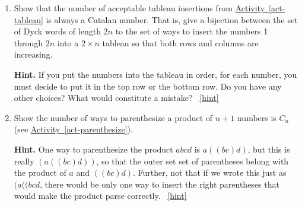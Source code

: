 \documentclass{book}
\begin{document}
\setcounter{project}{179}
\addtocounter{project}{-1}
\begin{activity}[]\label{activity-172}
\leavevmode%
\begin{enumerate}[font=\bfseries,label=(\alph*),ref=\alph*]
\item\label{task-189} \hypertarget{p-1028}{}%
Show that the number of acceptable tableau insertions from \hyperref[act-tableau]{Activity~\ref{act-tableau}} is always a Catalan number.  That is, give a bijection between the set of Dyck words of length \(2n\) to the set of ways to insert the numbers 1 through \(2n\) into a \(2\times n\) tableau so that both rows and columns are increasing.%
\par\smallskip%
\noindent\textbf{Hint.}\hypertarget{hint-118}{}\quad%
\hypertarget{p-1029}{}%
If you put the numbers into the tableau in order, for each number, you must decide to put it in the top row or the bottom row.  Do you have any other choices?  What would constitute a mistake?%
~\hfill{\tiny\hyperlink{a-179.a}{[hint]}\hypertarget{q-179.a}{}}\item\label{task-190} \hypertarget{p-1030}{}%
Show the number of ways to parenthesize a product of \(n+1\) numbers is \(C_n\) (see \hyperref[act-parenthesize]{Activity~\ref{act-parenthesize}}).%
\par\smallskip%
\noindent\textbf{Hint.}\hypertarget{hint-119}{}\quad%
\hypertarget{p-1031}{}%
One way to parenthesize the product \(abcd\) is \(a((bc)d)\), but this is really \((a((bc)d))\), so that the outer set set of parentheses belong with the product of \(a\) and \(((bc)d)\).  Further, not that if we wrote this just as \((a((bcd\), there would be only one way to insert the right parentheses that would make the product parse correctly.%
~\hfill{\tiny\hyperlink{a-179.b}{[hint]}\hypertarget{q-179.b}{}}\end{enumerate}
\end{activity}

\clearpage
\end{document}
